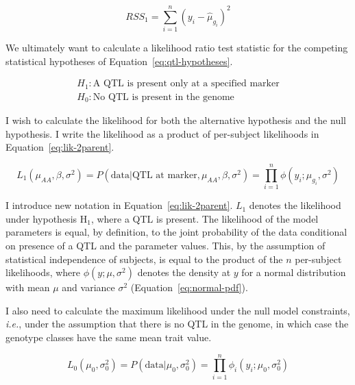 \documentclass[oneside]{book}\usepackage[]{graphicx}\usepackage[]{color}
\begin{document}
\begin{equation}
RSS_1 = \sum_{i=1}^n(y_i - \hat\mu_{g_i})^2
\label{eq:rss1}
\end{equation}

We ultimately want to calculate a likelihood ratio test statistic
for the competing statistical hypotheses of Equation~\ref{eq:qtl-hypotheses}.

\begin{eqnarray}
H_1: \text{A QTL is present only at a specified marker}\nonumber \\
H_0: \text{No QTL is present in the genome}
\label{eq:qtl-hypotheses}
\end{eqnarray}

I wish to calculate the likelihood for both the alternative hypothesis and the null hypothesis.
I write the likelihood as a product of per-subject likelihoods in Equation~\ref{eq:lik-2parent}.

\begin{equation}
L_1(\mu_{AA}, \beta, \sigma^2) = P(\text{data}| \text{QTL at marker}, \mu_{AA}, \beta, \sigma^2) = \prod_{i=1}^n\phi(y_i; \mu_{g_i}, \sigma^2)
\label{eq:lik-2parent}
\end{equation}

I introduce new notation in Equation~\ref{eq:lik-2parent}. $L_1$ denotes the likelihood under 
hypothesis H$_1$, where a QTL is present. The likelihood of the model parameters is equal, by definition, to the joint 
probability of the data conditional on presence of a QTL and the parameter values. This, by the 
assumption of statistical independence of subjects, is equal to the product of the $n$ 
per-subject likelihoods, where $\phi(y; \mu, \sigma^2)$ denotes the density at $y$ for a normal 
distribution with mean $\mu$ and variance $\sigma^2$ (Equation~\ref{eq:normal-pdf}).


I also need to calculate the maximum likelihood under the null model constraints, \emph{i.e.}, under the assumption that there is no QTL in the genome, in which case the genotype classes have the same mean trait value. 

\begin{equation}
L_0(\mu_0, \sigma^2_0) = P(\text{data}| \mu_0, \sigma^2_0) = \prod_{i=1}^n \phi_i(y_i; \mu_0, \sigma^2_0)
\end{equation}
\end{document}
